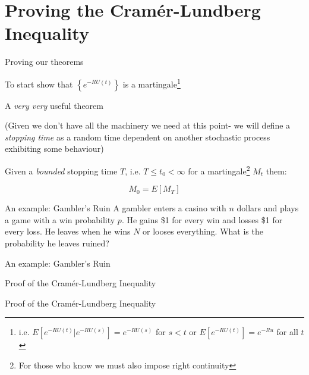 \documentclass[11pt]{beamer}
\begin{document}
\section{Proving the Cram\'er-Lundberg Inequality}
\begin{frame}{Proving our theorems}



\vspace{- 4.5 cm} To start show that $\left\{e^{-R U(t)}\right\}$ is a martingale\footnote{i.e. $E\left[ e^{-R U(t)}| e^{-R U(s)}\right]=e^{-RU(s)}$ for $s<t$ or $E\left[ e^{-R U(t)}\right]=e^{-Ru}$ for all $t$}



\end{frame}
\begin{frame}{A \textit{very very} useful theorem}

(Given we don't have all the machinery we need at this point- we will define a \emph{stopping time} as a random time dependent on another stochastic process exhibiting some behaviour)

\begin{theorem}
Given a \emph{bounded} stopping time $T$, i.e. $T\leq t_0 < \infty$ for a martingale\footnote{For those who know we must also impose right continuity} $M_t$ them:

$$ M_0 = E[M_T] $$

\end{theorem}

\end{frame}
\begin{frame}{An example: Gambler's Ruin}
\vspace{-3 cm}
A gambler enters a casino with $n$ dollars and plays a game with a win probability $p$. He gains \$1 for every win and losses \$1 for every loss. He leaves when he wins $N$ or looses everything. What is the probability he leaves ruined?

\end{frame}
\begin{frame}{An example: Gambler's Ruin}

\end{frame}
\begin{frame}{Proof of the Cram\'er-Lundberg Inequality}



\end{frame}
\begin{frame}{Proof of the Cram\'er-Lundberg Inequality}

\end{frame}
\end{document}
